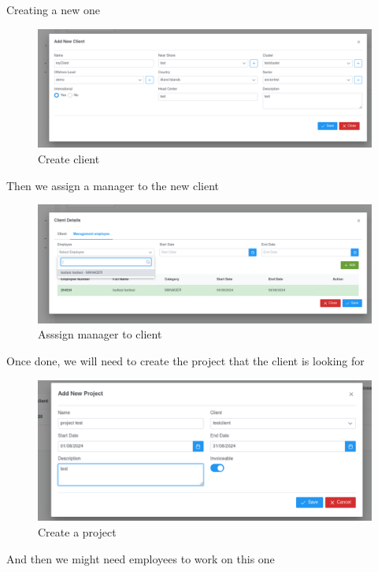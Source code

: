 \documentclass[12pt,a4paper,table,english]{article}
\begin{document}
	Creating a new one

	\begin{figure}[H]
		\centering
		\includegraphics[width=150mm]{Image/clientadd}
		\caption{Create client}
		\label{fig:Create client}
	\end{figure}

	Then we assign a manager to the new client
	
	\begin{figure}[H]
		\centering
		\includegraphics[width=150mm]{Image/clientassign}
		\caption{Asssign manager to client}
		\label{fig:Create client}
	\end{figure}

	Once done, we will need to create the project that the client is looking for
	\begin{figure}[H]
		\centering
		\includegraphics[width=150mm]{Image/projectadd}
		\caption{Create a project}
		\label{fig:Create a project}
	\end{figure}
	
	And then we might need employees to work on this one
\end{document}
